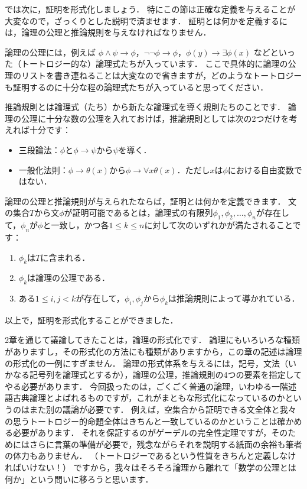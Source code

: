 \documentclass[./main]{subfiles}
\begin{document}
では次に，証明を形式化しましょう．
特にこの節は正確な定義を与えることが大変なので，ざっくりとした説明で済ませます．
証明とは何かを定義するには，論理の公理と推論規則を与えなければなりません．

論理の公理には，例えば
$\phi\land\psi\to\phi$，$\neg\neg\phi\to\phi$，$\phi(y)\to\exists\phi(x)$
などといった（トートロジー的な）論理式たちが入っています．
ここで具体的に論理の公理のリストを書き連ねることは大変なので省きますが，どのようなトートロジーも証明するのに十分な程の論理式たちが入っていると思ってください．

推論規則とは論理式（たち）から新たな論理式を導く規則たちのことです．
論理の公理に十分な数の公理を入れておけば，推論規則としては次の2つだけを考えれば十分です：
\begin{itemize}
\item 三段論法：$\phi$と$\phi\to\psi$から$\psi$を導く．
\item 一般化法則：$\phi\to\theta(x)$から$\phi\to\forall x\theta(x)$．ただし$x$は$\phi$における自由変数ではない．
 \end{itemize}

論理の公理と推論規則が与えられたならば，証明とは何かを定義できます．
文の集合$T$から文$\phi$が証明可能であるとは，論理式の有限列$\phi_1,\phi_2,\ldots,\phi_n$が存在して，$\phi_n$が$\phi$と一致し，かつ各$1\leq k\leq n$に対して次のいずれかが満たされることです：
\begin{enumerate}
\item $\phi_k$は$T$に含まれる．
\item $\phi_k$は論理の公理である．
\item ある$1\leq i, j <k$が存在して，$\phi_i, \phi_j$から$\phi_k$は推論規則によって導かれている．
\end{enumerate}
以上で，証明を形式化することができました．

2章を通じて議論してきたことは，論理の形式化です．
論理にもいろいろな種類がありますし，その形式化の方法にも種類がありますから，この章の記述は論理の形式化の一例にすぎません．
論理の形式体系を与えるには，記号，文法（いかなる記号列を論理式とするか），論理の公理，推論規則の4つの要素を指定してやる必要があります．
今回扱ったのは，ごくごく普通の論理，いわゆる一階述語古典論理とよばれるものですが，これがまともな形式化になっているのかというのはまた別の議論が必要です．
例えば，空集合から証明できる文全体と我々の思うトートロジー的命題全体はきちんと一致しているのかということは確かめる必要があります．
それを保証するのがゲーデルの完全性定理ですが，そのためにはさらに言葉の準備が必要で，残念ながらそれを説明する紙面の余裕も筆者の体力もありません．
（トートロジーであるという性質をきちんと定義しなければいけない！）
ですから，我々はそろそろ論理から離れて「数学の公理とは何か」という問いに移ろうと思います．
\end{document}
